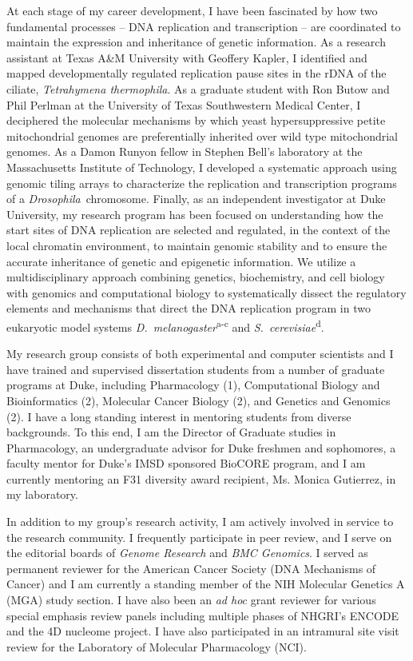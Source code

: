 \documentclass{nihbiosketch}
\newcommand\dros{{\itshape Drosophila}\xspace}
\newcommand\dmel{{\itshape D.~melanogaster}\xspace}
\newcommand\scer{{\itshape S.~cerevisiae}\xspace}
\begin{document}
\begin{statement}
\addtolength{\parskip}{1.5mm}
\noindent At each stage of my career development, I have been fascinated by how two fundamental processes -- DNA replication and transcription -- are coordinated to maintain the expression and inheritance of genetic information.  As a research assistant at Texas A\&M University with Geoffery Kapler, I identified and mapped developmentally regulated replication pause sites in the rDNA of the ciliate, \textit{Tetrahymena thermophila}.  As a graduate student with Ron Butow and Phil Perlman at the University of Texas Southwestern Medical Center, I deciphered the molecular mechanisms by which yeast hypersuppressive petite mitochondrial genomes are preferentially inherited over wild type mitochondrial genomes.  As a Damon Runyon fellow in Stephen Bell's laboratory at the Massachusetts Institute of Technology, I developed a systematic approach using genomic tiling arrays to characterize the replication and transcription programs of a \dros\ chromosome. Finally, as an independent investigator at Duke University, my research program has been focused on understanding how the start sites of DNA replication are selected and regulated, in the context of the local chromatin environment, to maintain genomic stability and to ensure the accurate inheritance of genetic and epigenetic information. We utilize a multidisciplinary approach combining genetics, biochemistry, and cell biology with genomics and computational biology to systematically dissect the regulatory elements and mechanisms that direct the DNA replication program in two eukaryotic model systems \dmel \textsuperscript{a-c} and \scer \textsuperscript{d}.

\noindent My research group consists of both experimental and computer scientists and I have trained and supervised dissertation students from a number of graduate programs at Duke, including Pharmacology (1), Computational Biology and Bioinformatics (2), Molecular Cancer Biology (2), and Genetics and Genomics (2).   I have a long standing interest in mentoring students from diverse backgrounds.  To this end, I am the Director of Graduate studies in Pharmacology, an undergraduate advisor for Duke freshmen and sophomores, a faculty mentor for Duke's IMSD sponsored BioCORE program, and I am currently mentoring an F31 diversity award recipient, Ms. Monica Gutierrez, in my laboratory.

\noindent In addition to my group's research activity, I am actively involved in service to the research community.  I frequently participate in peer review, and I serve on the editorial boards of \textit{Genome Research} and \textit{BMC Genomics}.  I served as permanent reviewer for the American Cancer Society (DNA Mechanisms of Cancer) and I am currently a standing member of the NIH Molecular Genetics A (MGA) study section.  I have also been an \emph{ad hoc} grant reviewer for various special emphasis review panels including multiple phases of NHGRI's ENCODE and the 4D nucleome project. I have also participated in an intramural site visit review for the Laboratory of Molecular Pharmacology (NCI).


\end{statement}
\end{document}
